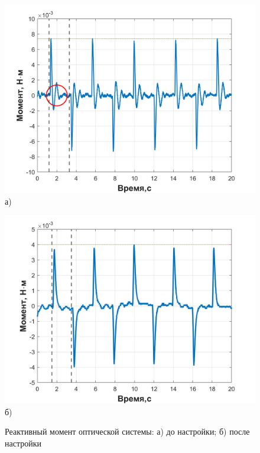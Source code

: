  \begin{figure}[h!]
 	\begin{minipage}[b]{0.49\linewidth}\centering
 		\includegraphics[width=1\linewidth]{matlab/img/scanner_no_sinchron} \\ а)
 	\end{minipage}
 	\hfill
 	\begin{minipage}[b]{0.49\linewidth}\centering
 		\includegraphics[width=1\linewidth]{matlab/img/scanner_correct} \\ б)
 	\end{minipage}
 	\caption{Реактивный момент оптической системы: а) до настройки; б) после настройки}
 	\label{fig:scan-mom}
 \end{figure}
 

